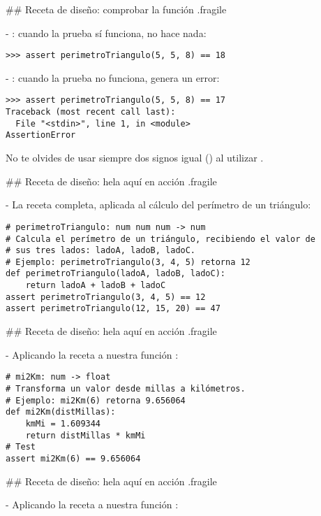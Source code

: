 ## Receta de diseño: comprobar la función {.fragile}

- : cuando la prueba sí funciona, no hace nada:

\begin{lstlisting}
>>> assert perimetroTriangulo(5, 5, 8) == 18
\end{lstlisting}

- : cuando la prueba no funciona, genera un error:

\begin{lstlisting}
>>> assert perimetroTriangulo(5, 5, 8) == 17
Traceback (most recent call last):
  File "<stdin>", line 1, in <module>
AssertionError
\end{lstlisting}

\bgnblockidea
No te olvides de usar siempre dos signos igual (\nzinlinecode{==}) al utilizar .
\trmblockidea

## Receta de diseño: hela aquí en acción {.fragile}


- La receta completa, aplicada al cálculo del perímetro de un triángulo:

\begin{lstlisting}[style=frame02]
# perimetroTriangulo: num num num -> num
# Calcula el perímetro de un triángulo, recibiendo el valor de
# sus tres lados: ladoA, ladoB, ladoC.
# Ejemplo: perimetroTriangulo(3, 4, 5) retorna 12
def perimetroTriangulo(ladoA, ladoB, ladoC):
    return ladoA + ladoB + ladoC
assert perimetroTriangulo(3, 4, 5) == 12
assert perimetroTriangulo(12, 15, 20) == 47
\end{lstlisting}

## Receta de diseño: hela aquí en acción {.fragile}


- Aplicando la receta a nuestra función :

\begin{lstlisting}[style=frame02]
# mi2Km: num -> float
# Transforma un valor desde millas a kilómetros.
# Ejemplo: mi2Km(6) retorna 9.656064
def mi2Km(distMillas):
    kmMi = 1.609344
    return distMillas * kmMi
# Test
assert mi2Km(6) == 9.656064
\end{lstlisting}

## Receta de diseño: hela aquí en acción {.fragile}


- Aplicando la receta a nuestra función :

